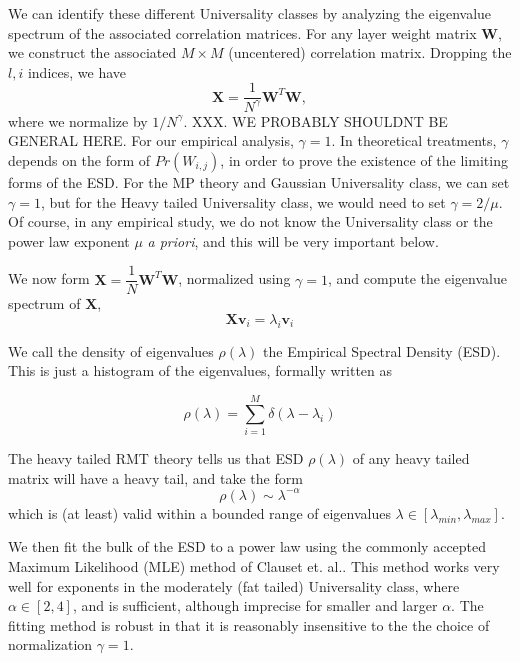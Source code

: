 We can identify these different Universality classes by analyzing the eigenvalue spectrum of the associated correlation matrices. 
For any layer weight matrix $\mathbf{W}$, we construct the associated $M\times M$ (uncentered) correlation matrix. 
Dropping the $l,i$ indices, we have
\begin{equation}
\mathbf{X} = \dfrac{1}{N^{\gamma}}\mathbf{W}^{T}\mathbf{W}  ,
\label{eqn:unc_corr_mat}
\end{equation}
where we normalize by $1/N^{\gamma}$. 
XXX.  WE PROBABLY SHOULDNT BE GENERAL HERE.
For our empirical analysis, $\gamma=1$. 
In theoretical treatments, $\gamma$ depends on the form of $Pr(W_{i,j})$, in order to prove the existence of the limiting forms of the ESD.
For the MP theory and Gaussian Universality class, we can set $\gamma=1$, but for the Heavy tailed Universality class, we would need to set $\gamma=2/\mu$.
Of course, in any empirical study, we do not know the Universality class or the power law exponent $\mu$ \emph{a priori}, and this will be very important below. 

We now form $\mathbf{X}= \dfrac{1}{N}\mathbf{W}^{T}\mathbf{W}$, normalized using $\gamma=1$, and compute the eigenvalue spectrum of $\mathbf{X}$, 
$$
\mathbf{X}\mathbf{v}_{i}=\lambda_{i}\mathbf{v}_{i}
$$

We call the density of eigenvalues $\rho(\lambda)$ the Empirical Spectral Density (ESD).  This is just a histogram of the eigenvalues, formally written as

$$\rho(\lambda)=\sum\limits_{i=1}^{M}\delta(\lambda-\lambda_{i})$$

The heavy tailed RMT theory tells us that ESD  $\rho(\lambda)$ of any heavy tailed matrix will have a heavy tail, and take the form
$$
\rho(\lambda)\sim\lambda^{-\alpha}
$$
which is (at least) valid within a bounded range of eigenvalues $\lambda\in[\lambda_{min},\lambda_{max}]$.  

We then fit the bulk of the ESD to a power law using the commonly accepted Maximum Likelihood (MLE) method of Clauset et. al..
This method works very well for exponents in the moderately (fat tailed) Universality class, where $\alpha\in[2,4]$,
and is sufficient, although imprecise for smaller and larger $\alpha$.  The fitting method is robust in that it is  reasonably
insensitive to the the choice of normalization $\gamma=1$.

